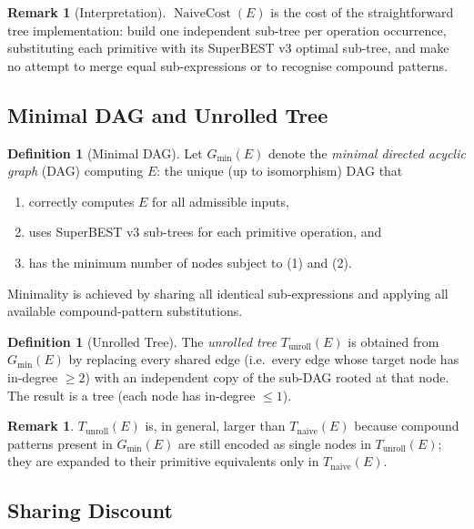\documentclass[12pt,a4paper]{article}
\theoremstyle{definition}
\newtheorem{definition}[theorem]{Definition}
\newtheorem{remark}[theorem]{Remark}
\newcommand{\NC}{\operatorname{NaiveCost}}
\newcommand{\Gmin}{G_{\min}(E)}
\newcommand{\Tnaive}{T_{\mathrm{naive}}(E)}
\newcommand{\Tunroll}{T_{\mathrm{unroll}}(E)}
\begin{document}
\begin{remark}[Interpretation]
$\NC(E)$ is the cost of the straightforward tree implementation: build one
independent sub-tree per operation occurrence, substituting each primitive with
its SuperBEST v3 optimal sub-tree, and make no attempt to merge equal
sub-expressions or to recognise compound patterns.
\end{remark}

\subsection{Minimal DAG and Unrolled Tree}

\begin{definition}[Minimal DAG]
\label{def:dag}
Let $\Gmin$ denote the \emph{minimal directed acyclic graph} (DAG) computing
$E$: the unique (up to isomorphism) DAG that
\begin{enumerate}
  \item correctly computes $E$ for all admissible inputs,
  \item uses SuperBEST v3 sub-trees for each primitive operation, and
  \item has the minimum number of nodes subject to (1) and (2).
\end{enumerate}
Minimality is achieved by sharing all identical sub-expressions and applying
all available compound-pattern substitutions.
\end{definition}

\begin{definition}[Unrolled Tree]
\label{def:unroll}
The \emph{unrolled tree} $\Tunroll$ is obtained from $\Gmin$ by replacing
every shared edge (i.e.\ every edge whose target node has in-degree $\geq 2$)
with an independent copy of the sub-DAG rooted at that node.  The result is a
tree (each node has in-degree $\leq 1$).
\end{definition}

\begin{remark}
$\Tunroll$ is, in general, larger than $\Tnaive$ because compound patterns
present in $\Gmin$ are still encoded as single nodes in $\Tunroll$; they are
expanded to their primitive equivalents only in $\Tnaive$.
\end{remark}

\subsection{Sharing Discount}
\end{document}
